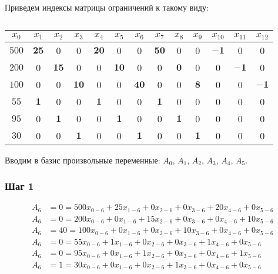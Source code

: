 Приведем индексы матрицы ограничений к такому виду:

\begin{table}[H]
	\centering
	\normalsize
	\caption{}
	\label{tbl:1}
	\begin{tabular}{|c|c|c|c|c|c|c|c|c|c|c|c|c|}
		\hline
		$x_{0}$&$x_{1}$&$x_{2}$&$x_{3}$&$x_{4}$&$x_{5}$&$x_{6}$&$x_{7}$&$x_{8}$&$x_{9}$&$x_{10}$&$x_{11}$&$x_{12}$\\ \hline
		$500$&$\mathbf{25}$&0&0&$\mathbf{20}$&0&0&$\mathbf{50}$&0&0&$\mathbf{-1}$&0&0\\ \hline
		$200$&0&$\mathbf{15}$&0&0&$\mathbf{10}$&0&0&$\mathbf{0}$&0&0&$\mathbf{-1}$&0\\ \hline
		$100$&0&0&$\mathbf{10}$&0&0&$\mathbf{40}$&0&0&$\mathbf{8}$&0&0&$\mathbf{-1}$\\ \hline
		$55$&$\mathbf{1}$&0&0&$\mathbf{1}$&0&0&$\mathbf{1}$&0&0&0&0&0\\ \hline
		$95$&0&$\mathbf{1}$&0&0&$\mathbf{1}$&0&0&$\mathbf{1}$&0&0&0&0\\ \hline
		$30$&0&0&$\mathbf{1}$&0&0&$\mathbf{1}$&0&0&$\mathbf{1}$&0&0&0\\ \hline

\end{tabular}

\end{table}

Вводим в базис произвольные переменные: $A_{0}$, $A_{1}$, $A_{2}$, $A_{3}$, $A_{4}$, $A_{5}$.

\subsubsection{Шаг 1}

\small

\vspace{-\baselineskip}\begin{align*}
	A_{6} &= 0 = 500x_{0-6} + 25x_{1-6} + 0x_{2-6} + 0x_{3-6} + 20x_{4-6} + 0x_{5-6} \\ 
	A_{6} &= 0 = 200x_{0-6} + 0x_{1-6} + 15x_{2-6} + 0x_{3-6} + 0x_{4-6} + 10x_{5-6} \\ 
	A_{6} &= 40 = 100x_{0-6} + 0x_{1-6} + 0x_{2-6} + 10x_{3-6} + 0x_{4-6} + 0x_{5-6} \\ 
	A_{6} &= 0 = 55x_{0-6} + 1x_{1-6} + 0x_{2-6} + 0x_{3-6} + 1x_{4-6} + 0x_{5-6} \\ 
	A_{6} &= 0 = 95x_{0-6} + 0x_{1-6} + 1x_{2-6} + 0x_{3-6} + 0x_{4-6} + 1x_{5-6} \\ 
	A_{6} &= 1 = 30x_{0-6} + 0x_{1-6} + 0x_{2-6} + 1x_{3-6} + 0x_{4-6} + 0x_{5-6}
\end{align*}

